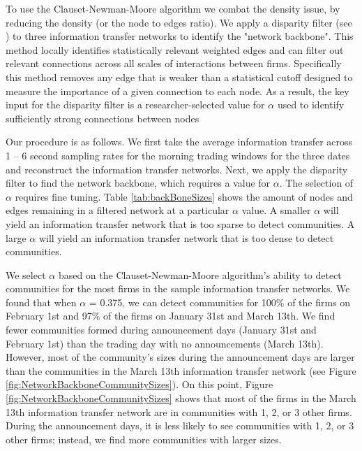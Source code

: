 To use the Clauset-Newman-Moore algorithm we combat the density issue,  by reducing the density (or the node to edges ratio).  We apply a disparity filter (see \cite{Serrano}) to three information transfer networks to identify the "network backbone".  This method locally identifies statistically relevant weighted edges and can filter out relevant connections across all scales of interactions between firms.  Specifically this method removes any edge that is weaker than a statistical cutoff designed to measure the importance of a given connection to each node.  As a result, the key input for the disparity filter is a researcher-selected value for \(\alpha \) used to identify sufficiently strong connections between nodes

Our procedure is as follows. We first take the average information transfer across 1 – 6 second sampling rates for the morning trading windows for the three dates and reconstruct the information transfer networks.  Next, we apply the disparity filter to find the network backbone, which requires a value for \(\alpha\). The selection of \(\alpha\) requires fine tuning.  Table \ref{tab:backBoneSizes} shows the amount of nodes and edges remaining in a filtered network at a particular  \(\alpha\) value.  A smaller \(\alpha\) will yield an information transfer network that is too sparse to detect communities. A large \(\alpha\) will yield an information transfer network that is too dense to detect communities. 

We select \(\alpha\) based on the Clauset-Newman-Moore algorithm’s ability to detect communities for the most firms in the sample information transfer networks.  We found that when \(\alpha\) = 0.375,  we can detect communities for 100\% of the firms on February 1st and 97\% of the firms on January 31st and March 13th.  We find fewer communities formed during announcement days (January 31st and February 1st) than the trading day with no announcements (March 13th).  However,  most of the community’s sizes during the announcement days are larger than the communities in the March 13th information transfer network (see Figure \ref{fig:NetworkBackboneCommunitySizes}).  On this point,  Figure \ref{fig:NetworkBackboneCommunitySizes} shows that most of the firms in the March 13th information transfer network are in communities with 1, 2, or 3 other firms. During the announcement days, it is less likely to see communities with 1, 2, or 3 other firms; instead, we find more communities with larger sizes.

